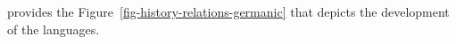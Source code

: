 \citet[]{Harbert2006a-u} provides the Figure~\vref{fig-history-relations-germanic} that depicts the development of
the  languages.
\begin{figure}
\begin{sideways}
\scalebox{.72}{%
}
\end{sideways}
\end{figure}
